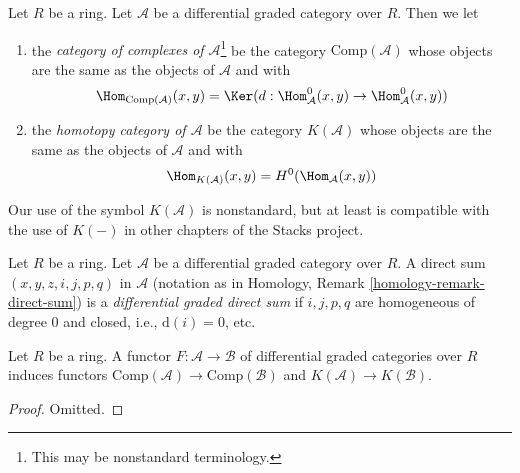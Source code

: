 \begin{definition}
\label{definition-homotopy-category-of-dga-category}
Let $R$ be a ring. Let $\mathcal{A}$ be a differential graded category
over $R$. Then we let
\begin{enumerate}
\item the {\it category of complexes of $\mathcal{A}$}\footnote{This may
be nonstandard terminology.} be the category
$\text{Comp}(\mathcal{A})$ whose objects are the same as the objects
of $\mathcal{A}$ and with
$$
\Hom_{\text{Comp}(\mathcal{A})}(x, y) =
\Ker(d : \Hom^0_\mathcal{A}(x, y) \to \Hom^0_\mathcal{A}(x, y))
$$
\item the {\it homotopy category of $\mathcal{A}$} be the category
$K(\mathcal{A})$ whose objects are the same as the objects
of $\mathcal{A}$ and with
$$
\Hom_{K(\mathcal{A})}(x, y) = H^0(\Hom_\mathcal{A}(x, y))
$$
\end{enumerate}
\end{definition}

\noindent
Our use of the symbol $K(\mathcal{A})$ is nonstandard, but at least
is compatible with the use of $K(-)$ in other chapters of the Stacks project.

\begin{definition}
\label{definition-dg-direct-sum}
Let $R$ be a ring. Let $\mathcal{A}$ be a differential graded category over
$R$. A direct sum $(x, y, z, i, j, p, q)$ in $\mathcal{A}$ (notation as in
Homology, Remark \ref{homology-remark-direct-sum})
is a {\it differential graded direct sum} if $i, j, p, q$ are homogeneous
of degree $0$ and closed, i.e., $\text{d}(i) = 0$, etc.
\end{definition}

\begin{lemma}
\label{lemma-functorial}
Let $R$ be a ring. A functor
$F : \mathcal{A} \to \mathcal{B}$
of differential graded categories over $R$
induces functors $\text{Comp}(\mathcal{A}) \to \text{Comp}(\mathcal{B})$
and $K(\mathcal{A}) \to K(\mathcal{B})$.
\end{lemma}

\begin{proof}
Omitted.
\end{proof}

